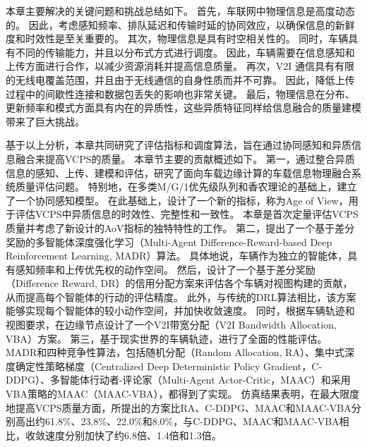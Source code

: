 本章主要解决的关键问题和挑战总结如下。
首先，车联网中物理信息是高度动态的。
因此，考虑感知频率、排队延迟和传输时延的协同效应，以确保信息的新鲜度和时效性是至关重要的。
其次，物理信息是具有时空相关性的。
同时，车辆具有不同的传输能力，并且以分布式方式进行调度。
因此，车辆需要在信息感知和上传方面进行合作，以减少资源消耗并提高信息质量。
再次，V2I 通信具有有限的无线电覆盖范围，并且由于无线通信的自身性质而并不可靠。
因此，降低上传过程中的间歇性连接和数据包丢失的影响也非常关键。
最后，物理信息在分布、更新频率和模式方面具有内在的异质性，这些异质特征同样给信息融合的质量建模带来了巨大挑战。

基于以上分析，本章共同研究了评估指标和调度算法，旨在通过协同感知和异质信息融合来提高VCPS的质量。
本章节主要的贡献概述如下。
第一，通过整合异质信息的感知、上传、建模和评估，研究了面向车载边缘计算的车载信息物理融合系统质量评估问题。
特别地，在多类M/G/1优先级队列和香农理论的基础上，建立了一个协同感知模型。
在此基础上，设计了一个新的指标，称为Age of View，用于评估VCPS中异质信息的时效性、完整性和一致性。
本章是首次定量评估VCPS质量并考虑了新设计的AoV指标的独特特性的工作。
第二，提出了一个基于差分奖励的多智能体深度强化学习（Multi-Agent Difference-Reward-based Deep Reinforcement Learning, MADR）算法。
具体地说，车辆作为独立的智能体，具有感知频率和上传优先权的动作空间。
然后，设计了一个基于差分奖励（Difference Reward, DR）的信用分配方案来评估各个车辆对视图构建的贡献，从而提高每个智能体的行动的评估精度。
此外，与传统的DRL算法相比，该方案能够实现每个智能体的较小动作空间，并加快收敛速度。
同时，根据车辆轨迹和视图要求，在边缘节点设计了一个V2I带宽分配（V2I Bandwidth Allocation, VBA）方案。
第三，基于现实世界的车辆轨迹，进行了全面的性能评估。
MADR和四种竞争性算法，包括随机分配（Random Allocation, RA）、集中式深度确定性策略梯度（Centralized Deep Deterministic Policy Gradient，C-DDPG）\cite{mlika2022deep}、多智能体行动者-评论家（Multi-Agent Actor-Critic，MAAC）\cite{he2021efficient}和采用VBA策略的MAAC（MAAC-VBA），都得到了实现。
仿真结果表明，在最大限度地提高VCPS质量方面，所提出的方案比RA、C-DDPG、MAAC和MAAC-VBA分别高出约61.8\%、23.8\%、22.0\%和8.0\%，与C-DDPG、MAAC和MAAC-VBA相比，收敛速度分别加快了约6.8倍、1.4倍和1.3倍。

